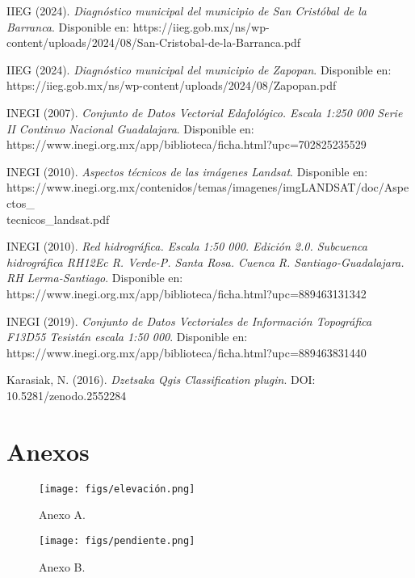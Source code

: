 \documentclass[12pt,letterpaper]{article}
\begin{document}
\begin{thebibliography}{100}

 IIEG (2024). \textit{Diagnóstico municipal del municipio de San Cristóbal de la Barranca}. Disponible en: https://iieg.gob.mx/ns/wp-content/uploads/2024/08/San-Cristobal-de-la-Barranca.pdf

 IIEG (2024). \textit{Diagnóstico municipal del municipio de Zapopan}. Disponible en: https://iieg.gob.mx/ns/wp-content/uploads/2024/08/Zapopan.pdf

 INEGI (2007). \textit{Conjunto de Datos Vectorial Edafológico. Escala 1:250 000 Serie II Continuo Nacional Guadalajara}. Disponible en: https://www.inegi.org.mx/app/biblioteca/ficha.html?upc=702825235529

 INEGI (2010). \textit{Aspectos técnicos de las imágenes Landsat}. Disponible en: https://www.inegi.org.mx/contenidos/temas/imagenes/imgLANDSAT/doc/Aspectos\_\\tecnicos\_landsat.pdf

 INEGI (2010). \textit{Red hidrográfica. Escala 1:50 000. Edición 2.0. Subcuenca hidrográfica RH12Ec R. Verde-P. Santa Rosa. Cuenca R. Santiago-Guadalajara. RH Lerma-Santiago}. Disponible en: https://www.inegi.org.mx/app/biblioteca/ficha.html?upc=889463131342

 INEGI (2019). \textit{Conjunto de Datos Vectoriales de Información Topográfica F13D55 Tesistán escala 1:50 000}. Disponible en: https://www.inegi.org.mx/app/biblioteca/ficha.html?upc=889463831440

 Karasiak, N. (2016). \textit{Dzetsaka Qgis Classification plugin}. DOI: 10.5281/zenodo.2552284

\end{thebibliography}



\newpage

\section*{Anexos}
\begin{figure}[H]
    \caption{Anexo A.}
    \label{anx:a}
    \centering
    \texttt{[image: figs/elevación.png]}
\end{figure}
\begin{figure}[H]
    \caption{Anexo B.}
    \label{anx:b}
    \centering
    \texttt{[image: figs/pendiente.png]}
\end{figure}
\end{document}
